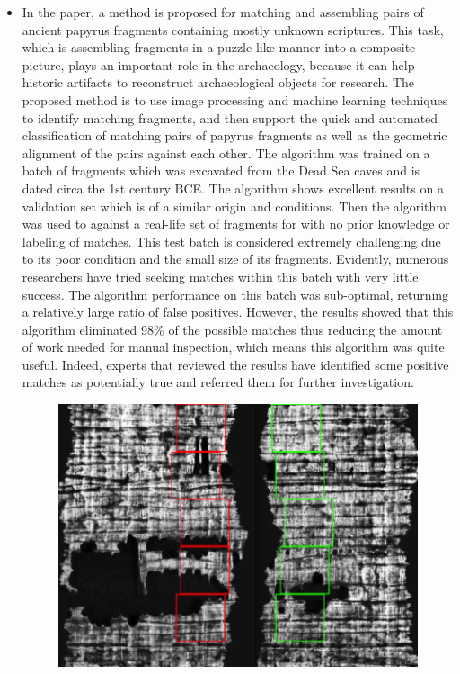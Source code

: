 \documentclass[journal]{IEEEtran}
\begin{document}
	\begin{itemize}
	\item In the paper\cite{Papyrus}, a method is proposed for matching and assembling pairs of ancient papyrus fragments containing mostly unknown scriptures.
		  This task, which is assembling fragments in a puzzle-like manner into a composite picture, plays an important role in the archaeology, because it can help historic artifacts to reconstruct archaeological objects for research.
		  The proposed method is to use image processing and machine learning techniques to identify matching fragments, and then support the quick and automated classification of matching pairs of papyrus fragments as well
		  as the geometric alignment of the pairs against each other. The algorithm was trained on a batch of fragments which was excavated from the Dead Sea caves and is dated circa the 1st
		  century BCE. The algorithm shows excellent results on a validation set which is of a similar origin and conditions.
		  Then the algorithm was used to  against a real-life set of fragments for with no prior knowledge or labeling of matches.
		  This test batch is considered extremely challenging due to its poor condition and the small size of its fragments. Evidently,
		  numerous researchers have tried seeking matches within this batch with very little success. The algorithm performance on
		  this batch was sub-optimal, returning a relatively large ratio of false positives. However, the results showed that this algorithm
		  eliminated 98\% of the possible matches thus reducing the amount of work needed for manual inspection, which means this algorithm was quite useful. Indeed, experts that
		  reviewed the results have identified some positive matches as potentially true and referred them for further investigation.
		  \begin{figure}[htbp]
			\centering
			\includegraphics[width=0.9\linewidth]{./picture/fig1.png}

\end{figure}
\end{itemize}
\end{document}
